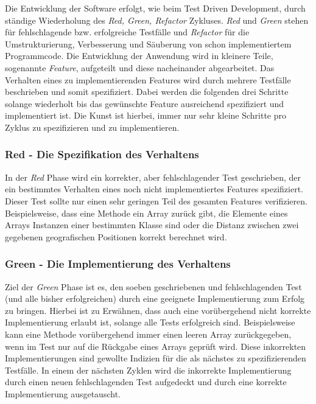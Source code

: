 Die Entwicklung der Software erfolgt, wie beim Test Driven
Development, durch ständige Wiederholung des \textit{Red, Green,
  Refactor} Zykluses. \textit{Red} und \textit{Green} stehen für
fehlschlagende bzw. erfolgreiche Testfälle und \textit{Refactor} für
die Umstrukturierung, Verbesserung und Säuberung von schon
implementiertem Programmcode. Die Entwicklung der Anwendung wird in
kleinere Teile, sogenannte \textit{Feature}, aufgeteilt und diese
nacheinander abgearbeitet. Das Verhalten eines zu implementierenden
Features wird durch mehrere Testfälle beschrieben und somit
spezifiziert. Dabei werden die folgenden drei Schritte solange
wiederholt bis das gewünschte Feature ausreichend spezifiziert und
implementiert ist. Die Kunst ist hierbei, immer nur sehr kleine
Schritte pro Zyklus zu spezifizieren und zu implementieren.

\subsubsection{Red - Die Spezifikation des Verhaltens}
In der \textit{Red} Phase wird ein korrekter, aber fehlschlagender
Test geschrieben, der ein bestimmtes Verhalten eines noch nicht
implementiertes Features spezifiziert. Dieser Test sollte nur einen
sehr geringen Teil des gesamten Features verifizieren. Beispielsweise,
dass eine Methode ein Array zurück gibt, die Elemente eines Arrays
Instanzen einer bestimmten Klasse sind oder die Distanz zwischen zwei
gegebenen geografischen Positionen korrekt berechnet wird.

\subsubsection{Green - Die Implementierung des Verhaltens}
Ziel der \textit{Green} Phase ist es, den soeben geschriebenen und
fehlschlagenden Test (und alle bisher erfolgreichen) durch eine
geeignete Implementierung zum Erfolg zu bringen. Hierbei ist zu
Erwähnen, dass auch eine vorübergehend nicht korrekte Implementierung
erlaubt ist, solange alle Tests erfolgreich sind. Beispielsweise kann
eine Methode vorübergehend immer einen leeren Array zurückgegeben,
wenn im Test nur auf die Rückgabe eines Arrays geprüft wird. Diese
inkorrekten Implementierungen sind gewollte Indizien für die als
nächstes zu spezifizierenden Testfälle. In einem der nächsten Zyklen
wird die inkorrekte Implementierung durch einen neuen fehlschlagenden
Test aufgedeckt und durch eine korrekte Implementierung ausgetauscht.

